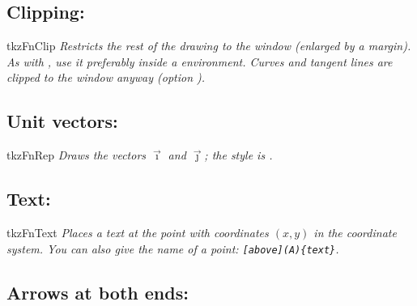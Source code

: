 \subsection{Clipping: }

\begin{NewMacroBox}{tkzFnClip}{}
\emph{Restricts the rest of the drawing to the window (enlarged by a margin). As with , use it preferably inside a  environment. Curves and tangent lines are clipped to the window anyway (option ).}
\end{NewMacroBox}

\subsection{Unit vectors: }

\begin{NewMacroBox}{tkzFnRep}{}
\emph{Draws the vectors $\vec{\imath}$ and $\vec{\jmath}$; the style is .}
\end{NewMacroBox}

\subsection{Text: }

\begin{NewMacroBox}{tkzFnText}{}
\emph{Places a text at the point with coordinates $(x, y)$ in the coordinate system. You can also give the name of a point: \texttt{[above](A)\{text\}}.}
\end{NewMacroBox}

\begin{tkzexample}[latex=8cm]
\end{tkzexample}

\subsection{Arrows at both ends: }\label{sec:arrows}

